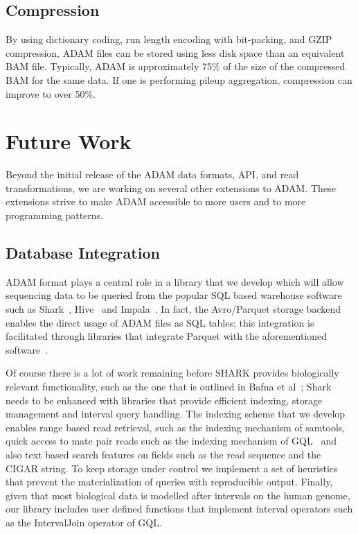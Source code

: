 \documentclass[10pt,twocolumn]{article}
\theoremstyle{plain}
\begin{document}
\subsection{Compression}
\label{sec:compression}

By using dictionary coding, run length encoding with bit-packing, and GZIP compression, ADAM files can be stored using less
disk space than an equivalent BAM file. Typically, ADAM is approximately 75\% of the size of the compressed BAM for the
same data. If one is performing pileup aggregation, compression can improve to over 50\%.

\section{Future Work}
\label{sec:future-work}

Beyond the initial release of the ADAM data formats, API, and read transformations, we are working on several other
extensions to ADAM. These extensions strive to make ADAM accessible to more users and to more programming patterns.

\subsection{Database Integration}
\label{sec:database-integration}

ADAM format plays a central role in a library that we develop which will allow sequencing data to be queried from 
the popular SQL based warehouse software such as Shark~\cite{shark}, Hive~\cite{hive} and Impala~\cite{impala}. In fact,
the Avro/Parquet storage backend enables the direct usage of ADAM files as SQL tables; this integration is facilitated through libraries 
that integrate Parquet with the aforementioned software~\cite{parquet}.

Of course there is a lot of work remaining before SHARK provides biologically relevant functionality,
such as the one that is outlined in Bafna et al~\cite{bafna2013}; Shark needs to be enhanced with libraries that provide
efficient indexing, storage management and interval query handling. The indexing scheme that we develop enables
range based read retrieval, such as the indexing mechanism of samtools, quick access to mate pair reads such as the
indexing mechanism of GQL~\cite{kozanitis13} and also text based search features on fields such as the read sequence
and the CIGAR string. To keep storage under control we implement a set of heuristics that prevent the materialization of
queries with reproducible output. Finally, given that most biological data is modelled after intervals on the human genome,
our library includes user defined functions that implement interval operators such as the IntervalJoin operator of GQL.
\end{document}
